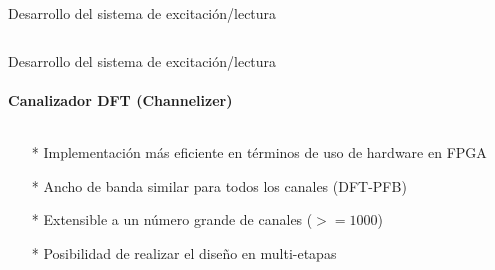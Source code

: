 \documentclass[ignorenonframetext,12pt]{beamer}
\begin{document}
\begin{frame}{Desarrollo del sistema de excitación/lectura}
\begin{columns}
\begin{column}{0.5\textwidth}
\begin{center}
												\end{center}
								\end{column}
				\end{columns}

\end{frame}

\begin{frame}{Desarrollo del sistema de excitación/lectura}
				\framesubtitle{Canalizador DFT (Channelizer)}
				\begin{columns}
								\begin{column}{0.4\textwidth}
												\begin{itemize}
																\item[*] Implementación m\'as eficiente en t\'erminos de uso de hardware en FPGA
																\item[*] Ancho de banda similar para todos los
																				canales (DFT-PFB)
																\item[*] Extensible a un n\'umero grande de canales ($>=1000$)
																\item[*] Posibilidad de realizar el diseño en multi-etapas
												\end{itemize}
								\end{column}
								\begin{column}{0.6\textwidth}


\end{column}
\end{columns}
\end{frame}
\end{document}
